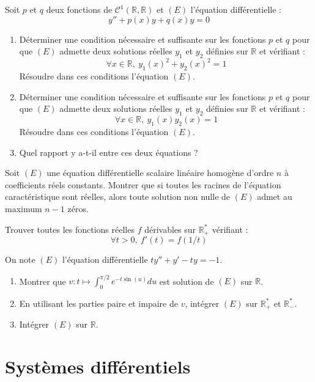 \documentclass[french,a4paper]{article}
\newcommand{\R}{\mathbb{R}}
\newcommand{\st}{^*}
\theoremstyle{plain}
\theoremstyle{definition}
\theoremstyle{remark}
\begin{document}
\begin{ex}[Moulin.17]{}
	Soit $p$ et $q$ deux fonctions de $\mathcal{C}^1(\R,\R)$ et $(E)$ l'équation différentielle : $$y''+p(x)y+q(x)y=0$$
	\begin{enumerate}
		\item Déterminer une condition nécessaire et suffisante sur les fonctions $p$ et $q$ pour que $(E)$ admette deux solutions réelles $y_1$ et $y_2$ définies sur $\R$ et vérifiant : $$\forall x\in\R,\ y_1(x)^2+y_2(x)^2=1$$
		Résoudre dans ces conditions l'équation $(E)$.
		\item Déterminer une condition nécessaire et suffisante sur les fonctions $p$ et $q$ pour que $(E)$ admette deux solutions réelles $y_1$ et $y_2$ définies sur $\R$ et vérifiant : $$\forall x\in\R,\ y_1(x)y_2(x)=1$$
		Résoudre dans ces conditions l'équation $(E)$.
		\item Quel rapport y a-t-il entre ces deux équations ?
	\end{enumerate}
\end{ex}

\begin{ex}[Moulin.18]{}
	Soit $(E)$ une équation différentielle scalaire linéaire homogène d'ordre $n$ à coefficients réels constants. Montrer que si toutes les racines de l'équation caractéristique sont réelles, alors toute solution non nulle de $(E)$ admet au maximum $n-1$ zéros.
\end{ex}

\begin{ex}[Moulin.19]{}
	Trouver toutes les fonctions réelles $f$ dérivables sur $\R_+\st$ vérifiant : $$\forall t>0,\ f'(t)=f(1/t)$$
\end{ex}

\begin{ex}[Moulin.20]{}
	On note $(E)$ l'équation différentielle $ty''+y'-ty=-1$.
	\begin{enumerate}
		\item Montrer que $v:t\mapsto\displaystyle\int_{0}^{\pi/2}e^{-t\sin(u)}du$ est solution de $(E)$ sur $\R$.
		\item En utilisant les parties paire et impaire de $v$, intégrer $(E)$ sur $\R_+\st$ et $\R_-\st$.
		\item Intégrer $(E)$ sur $\R$.
	\end{enumerate}
\end{ex}

\section{Systèmes différentiels}
\end{document}
